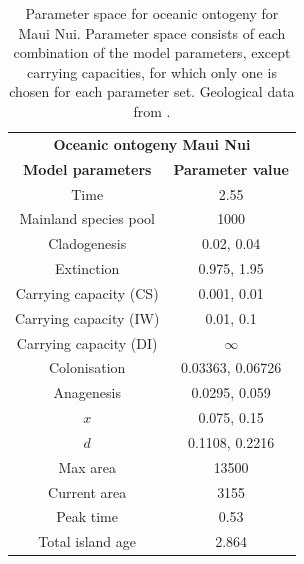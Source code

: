 \begin{table}[ht]
    \centering
    \caption{Parameter space for oceanic ontogeny for Maui Nui. Parameter space consists of each combination of the model parameters, except carrying capacities, for which only one is chosen for each parameter set. Geological data from \cite{lim_true_2017}.}
    \begin{tabular}{ c | c }
        \multicolumn{2}{c}{\textbf{Oceanic ontogeny Maui Nui}} \\
        \textbf{Model parameters} & \textbf{Parameter value} \\ 
        \hline
        \hline
        Time & 2.55 \\
        \hline
        Mainland species pool & 1000 \\
        \hline
        Cladogenesis & 0.02, 0.04 \\
        \hline
        Extinction & 0.975, 1.95 \\
        \hline
        Carrying capacity (CS) & 0.001, 0.01 \\
        \hline
        Carrying capacity (IW) & 0.01, 0.1 \\
        \hline
        Carrying capacity (DI) & $\infty$ \\
        \hline
        Colonisation & 0.03363, 0.06726 \\
        \hline
        Anagenesis & 0.0295, 0.059 \\
        \hline
        $x$ & 0.075, 0.15 \\
        \hline
        $d$ & 0.1108, 0.2216 \\
        \hline
        Max area & 13500 \\
        \hline
        Current area & 3155 \\
        \hline
        Peak time & 0.53 \\
        \hline
        Total island age & 2.864 \\
    \end{tabular}
    \label{tab:oceanic_ontogeny_young}
\end{table}

